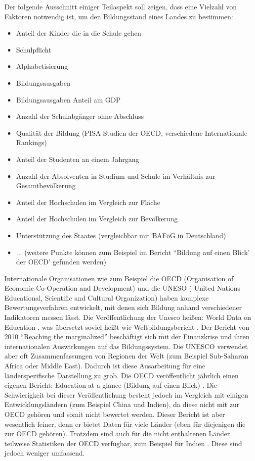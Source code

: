 Der folgende Ausschnitt einiger Teilaspekt soll zeigen, dass eine Vielzahl von Faktoren notwendig ist, um den Bildungsstand eines Landes zu bestimmen:
\begin{itemize} 
\item Anteil der Kinder die in die Schule gehen
\item Schulpflicht
\item Alphabetisierung
\item Bildungsausgaben
\item Bildungsausgaben Anteil am GDP
\item Anzahl der Schulabgänger ohne Abschluss
\item Qualität der Bildung (PISA Studien der OECD, verschiedene Internationale Rankings)
\item Anteil der Studenten an einem Jahrgang
\item Anzahl der Absolventen in Studium und Schule im Verhältnis zur Gesamtbevölkerung
\item Anteil der Hochschulen im Vergleich zur Fläche
\item Anteil der Hochschulen im Vergleich zur Bevölkerung
\item Unterstützung des Staates (vergleichbar mit BAFöG in Deutschland)
\item ... (weitere Punkte können zum Beispiel im Bericht ``Bildung auf einen Blick' der OECD' gefunden werden)
\end{itemize}

Internationale Organisationen wie zum Beispiel die OECD (Organisation of Economic Co-Operation and Development) und die UNESO ( United Nations Educational, Scientific and Cultural Organization) haben komplexe Bewertungsverfahren entwickelt, mit denen sich Bildung anhand verschiedener Indikatoren messen lässt.
Die Veröffentlichung der Unesco heißen: World Data on Education \cite{unesco2}, was  übersetzt soviel heißt wie Weltbildungsbericht \cite{unesco1}. Der Bericht von 2010 ``Reaching the marginalized'' beschäftigt sich mit der Finanzkrise und ihren internationalen Auswirkungen auf das Bildungssystem. Die UNESCO verwendet aber oft Zusammenfassungen von Regionen der Welt (zum Beispiel Sub-Saharan Africa oder Middle East). Dadurch ist diese Ausarbeitung für eine länderspezifische Darstellung zu grob. 
Die OECD veröffentlicht jährlich einen eigenen Bericht: Education at a glance (Bildung auf einen Blick) \cite{oecd5} . Die Schwierigkeit bei dieser Veröffentlichung  besteht jedoch im Vergleich mit einigen Entwicklungsländern (zum Beispiel China und Indien), da diese nicht mit zur OECD gehören und somit nicht bewertet werden. Dieser Bericht ist aber wesentlich feiner, denn er bietet Daten für viele Länder (eben für diejenigen die zur OECD gehören). Trotzdem sind auch für die nicht enthaltenen Länder teilweise Statistiken der OECD verfügbar, zum Beispiel für Indien \cite{oecd}. Diese sind jedoch weniger umfassend.

